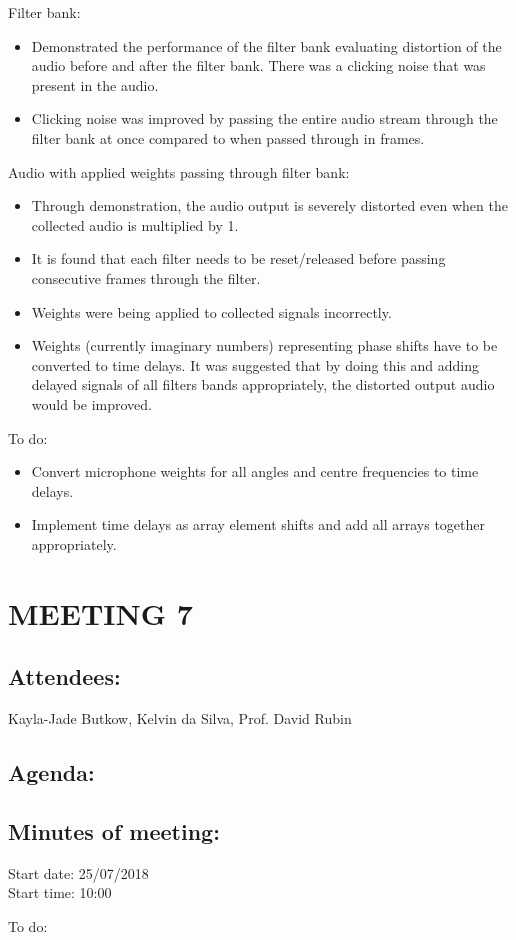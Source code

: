 \documentclass[10pt,onecolumn]{witseiepaper}
\begin{document}
Filter bank:
\begin{itemize}
	\item Demonstrated the performance of the filter bank evaluating distortion of the audio before and after the filter bank. There was a clicking noise that was present in the audio.
	\item Clicking noise was improved by passing the entire audio stream through the filter bank at once compared to when passed through in frames.
\end{itemize}

Audio with applied weights passing through filter bank:
\begin{itemize}
	\item Through demonstration, the audio output is severely distorted even when the collected audio is multiplied by 1.
	\item It is found that each filter needs to be reset/released before passing consecutive frames through the filter.
	\item Weights were being applied to collected signals incorrectly.
	\item Weights (currently imaginary numbers) representing phase shifts have to be converted to time delays. It was suggested that by doing this and adding delayed signals of all filters bands appropriately, the distorted output audio would be improved.
\end{itemize}

To do:
\begin{itemize}
	\item Convert microphone weights for all angles and centre frequencies to time delays.
	\item Implement time delays as array element shifts and add all arrays together appropriately.
\end{itemize}

\section*{MEETING 7}
\subsection*{Attendees:}
Kayla-Jade Butkow, Kelvin da Silva, Prof. David Rubin
\subsection*{Agenda:} 

\subsection*{Minutes of meeting:}
Start date: 25/07/2018 \\
Start time: 10:00


To do:
\end{document}
